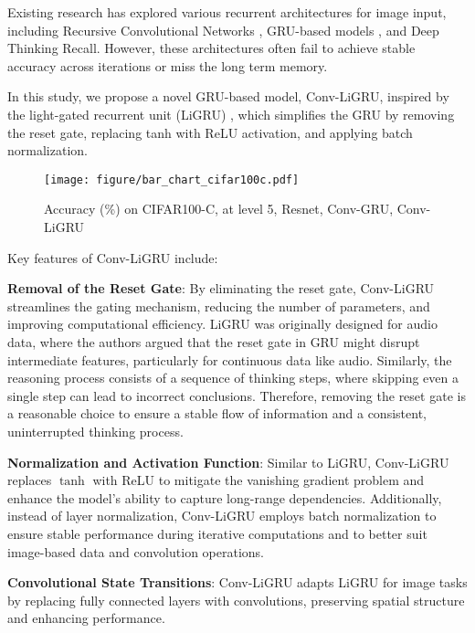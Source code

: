 Existing research has explored various recurrent architectures for image input, including Recursive Convolutional Networks \cite{recursiveCnn2014lecun}, GRU-based models \cite{Ballas2016Iclr}, and Deep Thinking Recall. 
However, these architectures often fail to achieve stable accuracy across iterations or miss the long term memory.

In this study, we propose a novel GRU-based model, Conv-LiGRU, inspired by the light-gated recurrent unit (LiGRU) \cite{ligru2018}, which simplifies the GRU by removing the reset gate, replacing tanh with ReLU activation, and applying batch normalization. 

\begin{figure*}[t!]
    \centering
    \texttt{[image: figure/bar\_chart\_cifar100c.pdf]}
        \caption{Accuracy (\%) on CIFAR100-C, at level 5, Resnet, Conv-GRU, Conv-LiGRU}
        \label{fig:bar_chart_cifar100c}
\end{figure*}

Key features of Conv-LiGRU include:

\textbf{Removal of the Reset Gate}: By eliminating the reset gate, Conv-LiGRU streamlines the gating mechanism, reducing the number of parameters, and improving computational efficiency. LiGRU was originally designed for audio data, where the authors argued that the reset gate in GRU might disrupt intermediate features, particularly for continuous data like audio. 
Similarly, the reasoning process consists of a sequence of thinking steps, where skipping even a single step can lead to incorrect conclusions. Therefore, removing the reset gate is a reasonable choice to ensure a stable flow of information and a consistent, uninterrupted thinking process.


\textbf{Normalization and Activation Function}: Similar to LiGRU, Conv-LiGRU replaces \( \tanh \) with ReLU to mitigate the vanishing gradient problem and enhance the model's ability to capture long-range dependencies. Additionally, instead of layer normalization, Conv-LiGRU employs batch normalization \cite{he2016residual} to ensure stable performance during iterative computations and to better suit image-based data and convolution operations.

\textbf{Convolutional State Transitions}: 
Conv-LiGRU adapts LiGRU for image tasks by replacing fully connected layers with convolutions, preserving spatial structure and enhancing performance.


